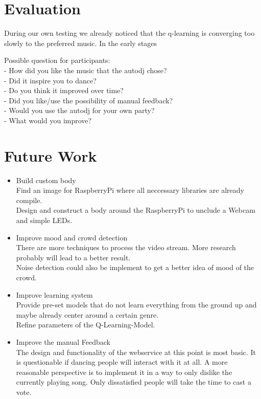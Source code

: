 \documentclass{article}
\begin{document}
\section{Evaluation}


During our own testing we already noticed that the q-learning is converging too slowly to the preferred music. In the early stages 

Possible question for participants:\\
- How did you like the music that the autodj chose?\\
- Did it inspire you to dance?\\
- Do you think it improved over time?\\
- Did you like/use the possibility of manual feedback?\\
- Would you use the autodj for your own party?\\
- What would you improve?


\section{Future Work}


\begin{itemize}
    \item Build custom body\\
        Find an image for RaspberryPi where all neccessary libraries are already compile. \\
        Design and construct a body around the RaspberryPi to unclude a Webcam and simple LEDs.
    
    \item Improve mood and crowd detection\\
        There are more techniques to process the video stream. More research probably will lead to a better result.\\
        Noise detection could also be implement to get a better idea of mood of the crowd.
    
    \item Improve learning system \\
        Provide pre-set models that do not learn everything from the ground up and maybe already center around a certain genre.\\
        Refine parameters of the Q-Learning-Model.
    
    \item Improve the manual Feedback\\
        The design and functionality of the webservice at this point is most basic. It is questionable if dancing people will interact with it at all. A more reasonable perspective is to implement it in a way to only dislike the currently playing song. Only dissatisfied people will take the time to cast a vote. 
\end{itemize}
\end{document}
